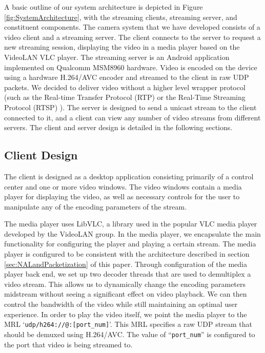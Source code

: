 \documentclass[a4paper,12pt]{article}
\begin{document}
A basic outline of our system architecture is depicted in Figure \ref{fig:SystemArchitecture}, with the streaming clients, streaming server, and constituent components. The camera system that we have developed consists of a video client and a streaming server. The client connects to the server to request a new streaming session, displaying the video in a media player based on the VideoLAN VLC player. The streaming server is an Android application implemented on Qualcomm MSM8960 hardware. Video is encoded on the device using a hardware H.264/AVC encoder and streamed to the client in raw UDP packets. We decided to deliver video without a higher level wrapper protocol (such as the Real-time Transfer Protocol (RTP) \cite{RTP} or the Real-Time Streaming Protocol (RTSP) \cite{RTSP}). The server is designed to send a unicast stream to the client connected to it, and a client can view any number of video streams from different servers. The client and server design is detailed in the following sections.

\subsection{Client Design}

The client is designed as a desktop application consisting primarily of a control center and one or more video windows. The video windows contain a media player for displaying the video, as well as necessary controls for the user to manipulate any of the encoding parameters of the stream. 

The media player uses LibVLC, a library used in the popular VLC media player developed by the VideoLAN group. In the media player, we encapsulate the main functionality for configuring the player and playing a certain stream.  The media player is configured to be consistent with the architecture described in section \ref{sec:NALandPacketization} of this paper. Through configuration of the media player back end, we set up two decoder threads that are used to demultiplex a video stream. This allows us to dynamically change the encoding parameters midstream without seeing a significant effect on video playback. We can then control the bandwidth of the video while still maintaining an optimal user experience. In order to play the video itself, we point the media player to the MRL `\verb=udp/h264://@:[port_num]='. This MRL specifies a raw UDP stream that should be demuxed using H.264/AVC. The value of ``\verb=port_num=''  is configured to the port that video is being streamed to.
\end{document}
